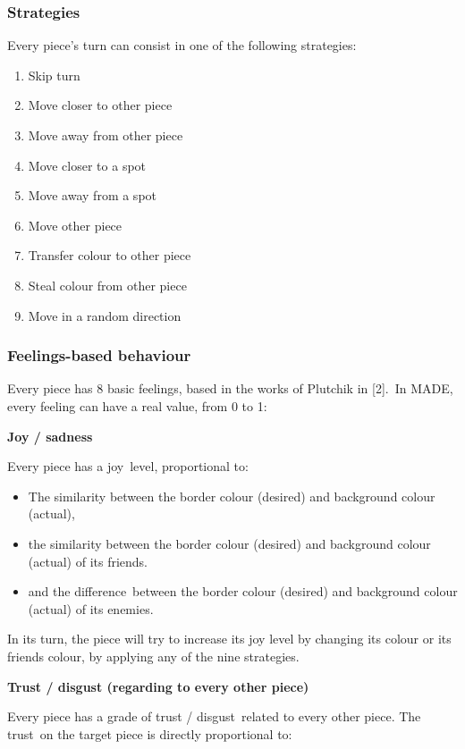 \documentclass[a4paper]{article}
\newcommand\textstyleStrongEmphasis[1]{\textbf{#1}}
\newcommand\liststyleLxiv{%
\renewcommand\theenumi{\arabic{enumi}}
\renewcommand\theenumii{\arabic{enumii}}
\renewcommand\theenumiii{\arabic{enumiii}}
\renewcommand\theenumiv{\arabic{enumiv}}
\renewcommand\labelenumi{\theenumi.}
\renewcommand\labelenumii{\theenumii.}
\renewcommand\labelenumiii{\theenumiii.}
\renewcommand\labelenumiv{\theenumiv.}
}
\newcommand\liststyleLxv{%
\renewcommand\labelitemi{{\textbullet}}
\renewcommand\labelitemii{{\textbullet}}
\renewcommand\labelitemiii{{\textbullet}}
\renewcommand\labelitemiv{{\textbullet}}
}
\begin{document}
\subsubsection{Strategies}
Every piece{\textquoteright}s turn can consist in one of the following
strategies:

\liststyleLxiv
\begin{enumerate}
\item Skip turn 
\item Move closer to other piece 
\item Move away from other piece 
\item Move closer to a spot 
\item Move away from a spot 
\item Move other piece 
\item Transfer colour to other piece 
\item Steal colour from other piece 
\item Move in a random direction 
\end{enumerate}
\subsubsection{Feelings-based behaviour}
Every piece has 8 basic feelings, based in the works of Plutchik in
[2].~In MADE, every feeling can have a real value, from 0 to 1:

\textstyleStrongEmphasis{Joy / sadness}

Every piece has a joy~level, proportional to:

\liststyleLxv
\begin{itemize}
\item The similarity between the border colour (desired) and background
colour (actual), 
\item the similarity between the border colour (desired) and background
colour (actual) of its friends. 
\item and the difference~between the border colour (desired) and
background colour (actual) of its enemies. 
\end{itemize}
In its turn, the piece will try to increase its joy level by changing
its colour or its friends colour, by applying any of the nine
strategies.

\textstyleStrongEmphasis{Trust / disgust (regarding to every other
piece)}

Every piece has a grade of trust / disgust~related to every other piece.
The trust~on the target piece is directly proportional to:
\end{document}
